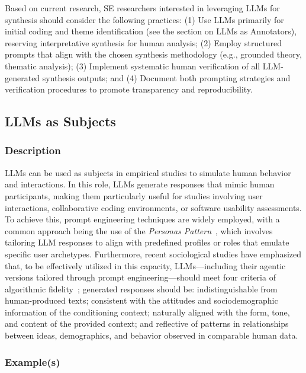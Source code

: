 Based on current research, SE researchers interested in leveraging LLMs for synthesis should consider the following practices:
(1) Use LLMs primarily for initial coding and theme identification (see the section on LLMs as Annotators), reserving interpretative synthesis for human analysis;
(2) Employ structured prompts that align with the chosen synthesis methodology (e.g., grounded theory, thematic analysis);
(3) Implement systematic human verification of all LLM-generated synthesis outputs; and  
(4) Document both prompting strategies and verification procedures to promote transparency and reproducibility.

\subsection{LLMs as Subjects}

\subsubsection{Description}

LLMs can be used as subjects in empirical studies to simulate human behavior and interactions. In this role, LLMs generate responses that mimic human participants, making them particularly useful for studies involving user interactions, collaborative coding environments, or software usability assessments. 
To achieve this, prompt engineering techniques are widely employed, with a common approach being the use of the \textit{Personas Pattern}~\cite{DBLP:journals/corr/abs-2308-07702}, which involves tailoring LLM responses to align with predefined profiles or roles that emulate specific user archetypes. 
Furthermore, recent sociological studies have emphasized that, to be effectively utilized in this capacity, LLMs—including their agentic versions tailored through prompt engineering—should meet four criteria of algorithmic fidelity~\cite{DBLP:journals/corr/abs-2209-06899}; generated responses should be: indistinguishable from human-produced texts; consistent with the attitudes and sociodemographic information of the conditioning context; naturally aligned with the form, tone, and content of the provided context; and reflective of patterns in relationships between ideas, demographics, and behavior observed in comparable human data.

\subsubsection{Example(s)}

